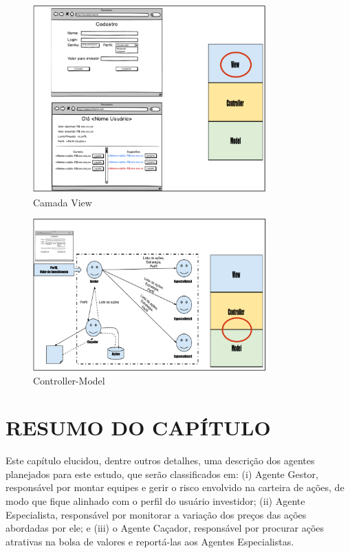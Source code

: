 \begin{figure}[h]
\centering
\label{f24}
\includegraphics[width=0.8\textwidth]{figuras/f24}
\caption{Camada View}
\end{figure}

\begin{figure}[h]
\centering
\label{f25}
\includegraphics[width=0.8\textwidth]{figuras/f25}
\caption{Controller-Model}
\end{figure}


\section{RESUMO DO CAPÍTULO}

Este capítulo elucidou, dentre outros detalhes, uma descrição dos agentes planejados para este estudo, que serão classificados em: (i) Agente Gestor, responsável por montar equipes e gerir o risco envolvido na carteira de ações, de modo que fique alinhado com o perfil do usuário investidor; (ii) Agente Especialista, responsável por monitorar a variação dos preços das ações abordadas por ele; e (iii) o Agente Caçador, responsável por procurar ações atrativas na bolsa de valores e reportá-las aos Agentes Especialistas.

